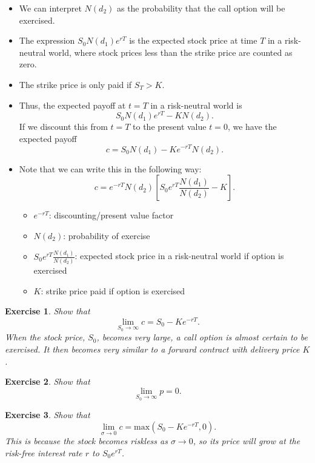 \documentclass[letterpaper,10pt]{article}
\newtheorem{ex}{Exercise}
\begin{document}
\begin{itemize}

\item We can interpret $N(d_2)$ as the probability that the call option will be exercised.

\item The expression $S_0N(d_1)e^{rT}$ is the expected stock price at time $T$ in a risk-neutral world, where stock prices less than the strike price are counted as zero.

\item The strike price is only paid if $S_T>K$.

\item Thus, the expected payoff at $t=T$ in a risk-neutral world is $$S_0N(d_1)e^{rT}-KN(d_2).$$  If we discount this from $t=T$ to the present value $t=0$, we have the expected payoff $$c=S_0N(d_1)-Ke^{-rT}N(d_2).$$

\item Note that we can write this in the following way: $$c=e^{-rT}N(d_2)\left[S_0e^{rT}\frac{N(d_1)}{N(d_2)}-K\right].$$

\begin{itemize}

\item $e^{-rT}$: discounting/present value factor

\item $N(d_2)$: probability of exercise

\item $\displaystyle S_0e^{rT}\frac{N(d_1)}{N(d_2)}$: expected stock price in a risk-neutral world if option is exercised

\item $K$: strike price paid if option is exercised

\end{itemize}

\end{itemize}


\begin{ex}
Show that $$\lim_{S_0\rightarrow\infty}c=S_0-Ke^{-rT}.$$ When the stock price, $S_0$, becomes very large, a call option is almost certain to be exercised. It then becomes very similar to a forward contract with delivery price $K$.
\end{ex}

\begin{ex}
Show that $$\lim_{S_0\rightarrow\infty}p=0.$$ 
\end{ex}

\begin{ex}
Show that $$\lim_{\sigma\rightarrow 0}c=\text{max}(S_0-Ke^{-rT},0).$$ This is because the stock becomes riskless as $\sigma\rightarrow 0$, so its price will grow at the risk-free interest rate $r$ to $S_0e^{rT}$.
\end{ex}
\end{document}
